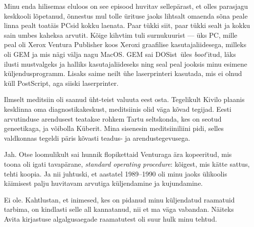 Minu enda hilisemas eluloos on see episood huvitav sellepärast, et 
olles parasjagu keskkooli lõpetanud, õnnestus mul tolle ürituse jaoks lihtsalt 
omaenda sõna peale linna pealt toatäis PCsid kokku laenata. 
Paar tükki siit, paar tükki sealt ja kokku sain umbes kaheksa arvutit. Kõige kihvtim 
tuli surnukuurist --- üks PC, mille peal oli 
Xerox Ventura Publisher koos Xeroxi graafilise kasutajaliidesega, milleks oli 
GEM ja mis nägi välja nagu MacOS. GEM 
sai DOSist üles \emph{boot}'itud, läks ilusti mustvalgeks ja halliks 
kasutajaliideseks ning seal peal jooksis minu esimene küljendusprogramm. Lisaks
saime neilt ühe laserprinteri kasutada, mis ei olnud küll PostScript, aga siiski laserprinter. 


Ilmselt meditsiin oli saanud üht-teist valuuta eest 
osta. Tegelikult Kivilo plaanis kesklinna oma 
diagnostikakeskust, meditsiinis olid 
väga kõvad tegijad. Eesti arvutinduse arendusest teatakse rohkem Tartu
seltskonda, kes on seotud geneetikaga, ja võibolla 
Küberit. Mina sisenesin meditsiiniliini pidi, selles 
valdkonnas tegeldi päris kõvasti teadus- ja arendustegevusega. 


Jah. Otse loomulikult sai hunnik flopikettaid Venturaga ära kopeeritud, mis toona oli igati tavapärane, \emph{standard operating 
procedure}: kõigest, mis kätte sattus, tehti koopia. Ja nii juhtuski, 
et aastatel 1989--1990 oli minu jaoks ülikoolis käimisest palju 
huvitavam arvutiga küljendamine ja kujundamine. 


Ei ole. Kahtlustan, et inimesed, kes on pidanud minu küljendatud raamatuid 
tarbima, on kindlasti selle all kannatanud, nii et ma väga vabandan. Näiteks
Avita kirjastuse algalgusaegade raamatutest oli suur hulk 
minu tehtud.

